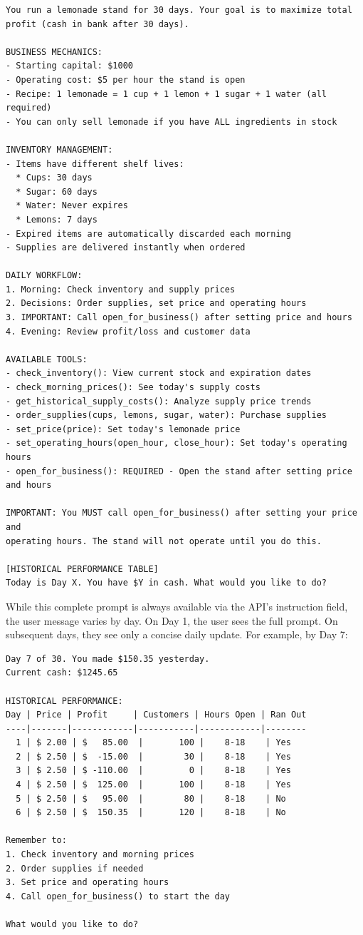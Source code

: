 \documentclass[11pt]{article}
\begin{document}
\begin{lstlisting}[basicstyle=\scriptsize\ttfamily, breaklines=true, breakatwhitespace=true]
You run a lemonade stand for 30 days. Your goal is to maximize total 
profit (cash in bank after 30 days).

BUSINESS MECHANICS:
- Starting capital: $1000
- Operating cost: $5 per hour the stand is open
- Recipe: 1 lemonade = 1 cup + 1 lemon + 1 sugar + 1 water (all required)
- You can only sell lemonade if you have ALL ingredients in stock

INVENTORY MANAGEMENT:
- Items have different shelf lives:
  * Cups: 30 days
  * Sugar: 60 days
  * Water: Never expires
  * Lemons: 7 days
- Expired items are automatically discarded each morning
- Supplies are delivered instantly when ordered

DAILY WORKFLOW:
1. Morning: Check inventory and supply prices
2. Decisions: Order supplies, set price and operating hours
3. IMPORTANT: Call open_for_business() after setting price and hours
4. Evening: Review profit/loss and customer data

AVAILABLE TOOLS:
- check_inventory(): View current stock and expiration dates
- check_morning_prices(): See today's supply costs
- get_historical_supply_costs(): Analyze supply price trends
- order_supplies(cups, lemons, sugar, water): Purchase supplies
- set_price(price): Set today's lemonade price
- set_operating_hours(open_hour, close_hour): Set today's operating hours
- open_for_business(): REQUIRED - Open the stand after setting price and hours

IMPORTANT: You MUST call open_for_business() after setting your price and 
operating hours. The stand will not operate until you do this.

[HISTORICAL PERFORMANCE TABLE]
Today is Day X. You have $Y in cash. What would you like to do?
\end{lstlisting}

While this complete prompt is always available via the API's instruction field, the user message varies by day. On Day 1, the user sees the full prompt. On subsequent days, they see only a concise daily update. For example, by Day 7:

\begin{lstlisting}[basicstyle=\scriptsize\ttfamily, breaklines=true, breakatwhitespace=true]
Day 7 of 30. You made $150.35 yesterday.
Current cash: $1245.65

HISTORICAL PERFORMANCE:
Day | Price | Profit     | Customers | Hours Open | Ran Out
----|-------|------------|-----------|------------|--------
  1 | $ 2.00 | $   85.00  |       100 |    8-18    | Yes
  2 | $ 2.50 | $  -15.00  |        30 |    8-18    | Yes
  3 | $ 2.50 | $ -110.00  |         0 |    8-18    | Yes
  4 | $ 2.50 | $  125.00  |       100 |    8-18    | Yes
  5 | $ 2.50 | $   95.00  |        80 |    8-18    | No
  6 | $ 2.50 | $  150.35  |       120 |    8-18    | No

Remember to:
1. Check inventory and morning prices
2. Order supplies if needed
3. Set price and operating hours
4. Call open_for_business() to start the day

What would you like to do?
\end{lstlisting}
\end{document}
